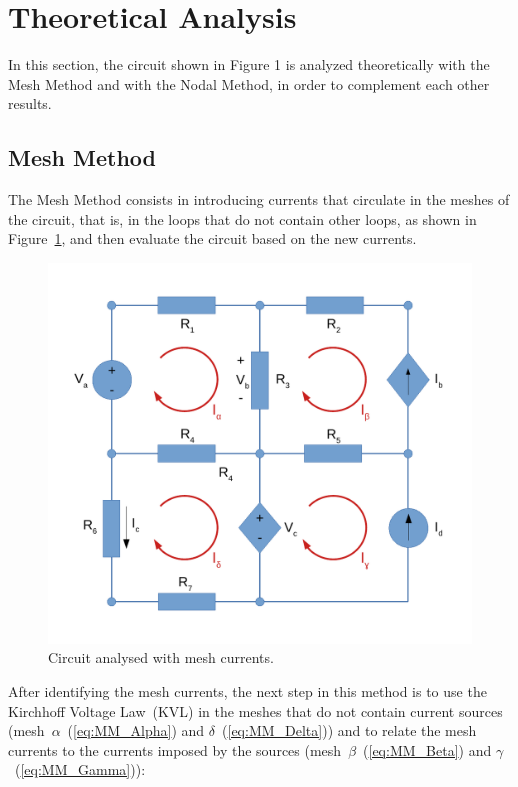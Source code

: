 \section{Theoretical Analysis}
\label{sec:analysis}

In this section, the circuit shown in Figure 1 is analyzed theoretically with the Mesh Method and with the Nodal Method, in order to complement each other results.

\subsection{Mesh Method}


The Mesh Method consists in introducing currents that circulate in the meshes of the circuit, that is, in the loops that do not contain other loops, as shown in Figure~\ref{fig:Circuit_Mesh}, and then evaluate the circuit based on the new currents.

\begin{figure}[h] \centering
\includegraphics[width=0.5\linewidth]{CircuitMesh.pdf}
\caption{Circuit analysed with mesh currents.}
\label{fig:Circuit_Mesh}
\end{figure}

After identifying the mesh currents, the next step in this method is to use the Kirchhoff Voltage Law~(KVL) in the meshes that do not contain current sources (mesh~$\alpha$~(\ref{eq:MM_Alpha}) and $\delta$~(\ref{eq:MM_Delta})) and to relate the mesh currents to the currents imposed by the sources (mesh~$\beta$~(\ref{eq:MM_Beta}) and $\gamma$~(\ref{eq:MM_Gamma})):

